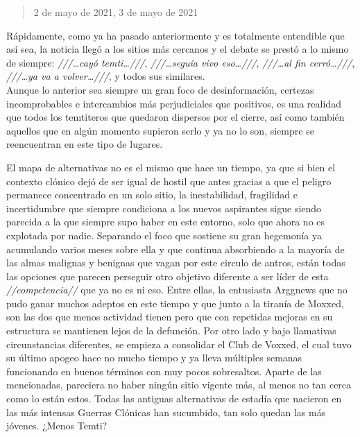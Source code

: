 \documentclass[
  spanish,
]{book}
\begin{document}
\begin{quote}
2 de mayo de 2021, 3 de mayo de 2021
\end{quote}

Rápidamente, como ya ha pasado anteriormente y es totalmente entendible que así sea, la noticia llegó a los sitios más cercanos y el debate se prestó a lo mismo de siempre: \emph{///\ldots cayó temti\ldots///}, \emph{///\ldots seguía vivo eso\ldots///}, \emph{///\ldots al fin cerró\ldots///}, \emph{///\ldots ya va a volver\ldots///}, y todos sus similares.\\
Aunque lo anterior sea siempre un gran foco de desinformación, certezas incomprobables e intercambios más perjudiciales que positivos, es una realidad que todos los temtiteros que quedaron dispersos por el cierre, así como también aquellos que en algún momento supieron serlo y ya no lo son, siempre se reencuentran en este tipo de lugares.

El mapa de alternativas no es el mismo que hace un tiempo, ya que si bien el contexto clónico dejó de ser igual de hostil que antes gracias a que el peligro permanece concentrado en un solo sitio, la inestabilidad, fragilidad e incertidumbre que siempre condiciona a los nuevos aspirantes sigue siendo parecida a la que siempre supo haber en este entorno, solo que ahora no es explotada por nadie. Separando el foco que sostiene su gran hegemonía ya acumulando varios meses sobre ella y que continua absorbiendo a la mayoría de las almas malignas y benignas que vagan por este circulo de antros, están todas las opciones que parecen perseguir otro objetivo diferente a ser líder de esta \emph{//competencia//} que ya no es ni eso. Entre ellas, la entusiasta Arggnews que no pudo ganar muchos adeptos en este tiempo y que junto a la tiranía de Moxxed, son las dos que menos actividad tienen pero que con repetidas mejoras en su estructura se mantienen lejos de la defunción. Por otro lado y bajo llamativas circunstancias diferentes, se empieza a consolidar el Club de Voxxed, el cual tuvo su último apogeo hace no mucho tiempo y ya lleva múltiples semanas funcionando en buenos términos con muy pocos sobresaltos. Aparte de las mencionadas, pareciera no haber ningún sitio vigente más, al menos no tan cerca como lo están estos. Todas las antiguas alternativas de estadía que nacieron en las más intensas Guerras Clónicas han sucumbido, tan solo quedan las más jóvenes. ¿Menos Temti?
\end{document}
